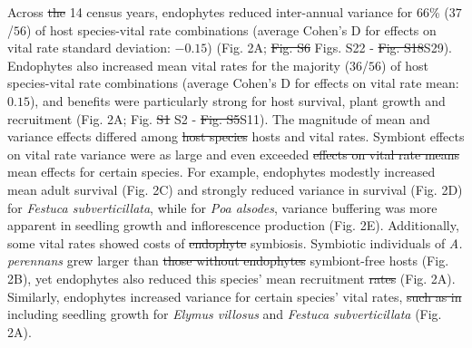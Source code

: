 \documentclass[lineno, sn-basic]{sn-jnl}%
\providecommand{\DIFadd}[1]{{\protect\color{blue}#1}} %
\providecommand{\DIFdel}[1]{{\protect\color{red}\protect\scriptsize\sout{#1}}}
\providecommand{\DIFadd}[1]{{\protect\color{blue}\uwave{#1}}} %
\providecommand{\DIFdel}[1]{{\protect\color{red}\sout{#1}}}                      %
\providecommand{\DIFaddbegin}{} %
\providecommand{\DIFaddend}{} %
\providecommand{\DIFdelbegin}{} %
\providecommand{\DIFdelend}{} %
\newcommand{\DIFscaledelfig}{0.5}
\newlength{\DIFdelgraphicswidth} %
\newlength{\DIFdelgraphicsheight} %
\newcommand{\DIFaddincludegraphics}[2][]{{\color{blue}\fbox{\DIFOincludegraphics[#1]{#2}}}} %
\newcommand{\DIFdelincludegraphics}[2][]{%
\sbox{\DIFdelgraphicsbox}{\DIFOincludegraphics[#1]{#2}}%
\settoboxwidth{\DIFdelgraphicswidth}{\DIFdelgraphicsbox} %
\settoboxtotalheight{\DIFdelgraphicsheight}{\DIFdelgraphicsbox} %
\scalebox{\DIFscaledelfig}{%
\parbox[b]{\DIFdelgraphicswidth}{\usebox{\DIFdelgraphicsbox}\\[-\baselineskip] \rule{\DIFdelgraphicswidth}{0em}}\llap{\resizebox{\DIFdelgraphicswidth}{\DIFdelgraphicsheight}{%
\setlength{\unitlength}{\DIFdelgraphicswidth}%
\begin{picture}(1,1)%
\thicklines\linethickness{2pt} %
{\color[rgb]{1,0,0}\put(0,0){\framebox(1,1){}}}%
{\color[rgb]{1,0,0}\put(0,0){\line( 1,1){1}}}%
{\color[rgb]{1,0,0}\put(0,1){\line(1,-1){1}}}%
\end{picture}%
}\hspace*{3pt}}} %
} %
\DeclareRobustCommand{\DIFaddbegin}{\DIFOaddbegin \let\includegraphics\DIFaddincludegraphics} %
\DeclareRobustCommand{\DIFaddend}{\DIFOaddend \let\includegraphics\DIFOincludegraphics} %
\DeclareRobustCommand{\DIFdelbegin}{\DIFOdelbegin \let\includegraphics\DIFdelincludegraphics} %
\DeclareRobustCommand{\DIFdelend}{\DIFOaddend \let\includegraphics\DIFOincludegraphics} %
\begin{document}
Across \DIFdelbegin \DIFdel{the }\DIFdelend 14 census years, endophytes reduced inter-annual variance for 66\% ($37$/$56$) of host species-vital rate combinations (average Cohen's D for effects on vital rate standard deviation: $-0.15$) (Fig. 2A; \DIFdelbegin \DIFdel{Fig. S6 }\DIFdelend \DIFaddbegin \DIFadd{Figs. S22 }\DIFaddend -  \DIFdelbegin \DIFdel{Fig. S18}\DIFdelend \DIFaddbegin \DIFadd{S29}\DIFaddend ). 
Endophytes also increased mean vital rates for the majority ($36$/$56$) of host species-vital rate combinations (average Cohen's D for effects on vital rate mean: $0.15$), and benefits were particularly strong for host survival, plant growth and recruitment (Fig. 2A; Fig. \DIFdelbegin \DIFdel{S1 }\DIFdelend \DIFaddbegin \DIFadd{S2 }\DIFaddend - \DIFdelbegin \DIFdel{Fig. S5}\DIFdelend \DIFaddbegin \DIFadd{S11}\DIFaddend ).
The magnitude of mean and variance effects differed among \DIFdelbegin \DIFdel{host species }\DIFdelend \DIFaddbegin \DIFadd{hosts }\DIFaddend and vital rates. 
Symbiont effects on vital rate variance were as large and even exceeded \DIFdelbegin \DIFdel{effects on vital rate means }\DIFdelend \DIFaddbegin \DIFadd{mean effects }\DIFaddend for certain species.
For example, endophytes modestly increased mean adult survival (Fig. 2C) and strongly reduced variance in survival (Fig. 2D) for \emph{Festuca subverticillata}, while for \emph{Poa alsodes}, variance buffering was more apparent in seedling growth and inflorescence production (Fig\DIFaddbegin \DIFadd{. }\DIFaddend 2E). 
Additionally, some vital rates showed costs of \DIFdelbegin \DIFdel{endophyte }\DIFdelend symbiosis. 
Symbiotic individuals of \emph{A. perennans} grew larger than \DIFdelbegin \DIFdel{those without endophytes }\DIFdelend \DIFaddbegin \DIFadd{symbiont-free hosts }\DIFaddend (Fig. 2B), yet endophytes also reduced this species' mean recruitment \DIFdelbegin \DIFdel{rates }\DIFdelend (Fig. 2A). 
Similarly, endophytes increased variance for certain species' vital rates, \DIFdelbegin \DIFdel{such as in }\DIFdelend \DIFaddbegin \DIFadd{including }\DIFaddend seedling growth for \emph{Elymus villosus} and \emph{Festuca subverticillata} (Fig. 2A).
\end{document}
